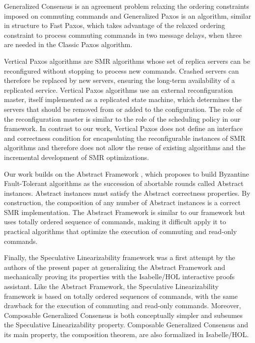 Generalized Consensus is an agreement problem relaxing the ordering constraints
imposed on commuting commands and Generalized Paxos is an algorithm, similar
in structure to Fast Paxos, which takes advantage of the relaxed ordering
constraint to process commuting commands in two message delays, when three are
needed in the Classic Paxos algorithm.

Vertical Paxos algorithms are SMR algorithms whose set of replica servers can
be reconfigured without stopping to process new commands. Crashed servers can
therefore be replaced by new servers, ensuring the long-term availability of a
replicated service. Vertical Paxos algorithms use an external reconfiguration
master, itself implemented as a replicated state machine, which determines
the servers that should be removed from or added to the configuration. The
role of the reconfiguration master is similar to the role of the scheduling
policy in our framework. In contrast to our work, Vertical Paxos does not define
an interface and correctness condition for encapsulating the reconfigurable
instances of SMR algorithms and therefore does not allow the reuse of existing
algorithms and the incremental development of SMR optimizations.

Our work builds on the Abstract Framework , which proposes to
build Byzantine Fault-Tolerant algorithms as the succession of abortable rounds
called Abstract instances. Abstract instances must satisfy the Abstract
correctness properties. By construction, the composition of any number of
Abstract instances is a correct SMR implementation. The Abstract
Framework is similar to our framework but uses totally ordered sequence of commands, making it difficult apply it to 
practical algorithms that optimize the execution of commuting and read-only commands. 

Finally, the Speculative Linearizability framework
\cite{GuerraouiKuncakLosa12SpeculativeLinearizability} was a first
attempt by the authors of the present paper at generalizing the
Abstract Framework and mechanically proving its properties with the
Isabelle/HOL interactive proofs assistant.  Like the Abstract Framework, the
Speculative Linearizability framework is based on totally ordered
sequences of commands, with the same drawback for the execution of
commuting and read-only commands. Moreover, Composable Generalized Consensus is both
conceptually simpler and subsumes the Speculative Linearizability
property. Composable Generalized Consensus
and its main property, the composition theorem, are also formalized in Isabelle/HOL.

